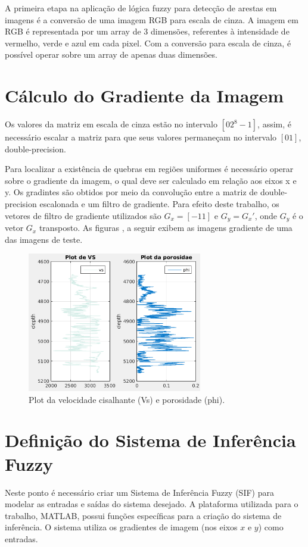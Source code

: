 \documentclass[11pt]{article}
\begin{document}
A primeira etapa na aplicação de lógica fuzzy para detecção de arestas em imagens é a conversão de uma imagem RGB para
escala de cinza. A imagem em RGB é representada por um array de 3 dimensões, referentes à intensidade de vermelho, verde e
azul em cada pixel. Com a conversão para escala de cinza, é possível operar sobre um array de apenas duas dimensões.

\section{Cálculo do Gradiente da Imagem}
Os valores da matriz em escala de cinza estão no intervalo $[0 2^8 - 1]$, assim, é necessário escalar a matriz para que seus valores
permaneçam no intervalo $[0 1]$, double-precision.

Para localizar a existência de quebras em regiões uniformes é necessário operar sobre o gradiente da imagem, o qual
deve ser calculado em relação aos eixos x e y. Os gradintes são obtidos por meio da convolução entre a
matriz de double-precision escalonada e um filtro de gradiente. Para efeito deste trabalho, os vetores de filtro de gradiente
utilizados são $G_x  = [-1 1]$ e $G_y = G_x '$, onde $G_y$ é o vetor $G_x$ transposto. As figuras , a seguir exibem as imagens
gradiente de uma das imagens de teste.



\begin{figure}[!ht]
\centering
\includegraphics[width=3.0in]{plotvsphi}
\caption{Plot da velocidade cisalhante (Vs) e porosidade (phi).}
\label{fig_grad}
\end{figure}

\section{Definição do Sistema de Inferência Fuzzy}

Neste ponto é necessário criar um Sistema de Inferência Fuzzy (SIF) para modelar as entradas e saídas do sistema desejado.
A plataforma utilizada para o trabalho, MATLAB, possui funções específicas para a criação do sistema de inferência. O sistema
utiliza os gradientes de imagem (nos eixos $x$ e $y$) como entradas.
\end{document}
